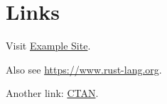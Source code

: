 \documentclass{article}
\begin{document}
\section{Links}
Visit \href{https://example.com}{Example Site}.

Also see \url{https://www.rust-lang.org}.

Another link: \href{https://ctan.org}{CTAN}.
\end{document}
